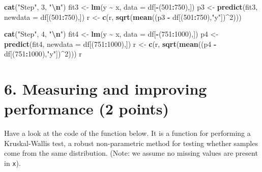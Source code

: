 \documentclass[
]{article}
\newenvironment{Shaded}{\begin{snugshade}}{\end{snugshade}}
\newcommand{\AttributeTok}[1]{\textcolor[rgb]{0.13,0.29,0.53}{#1}}
\newcommand{\DecValTok}[1]{\textcolor[rgb]{0.00,0.00,0.81}{#1}}
\newcommand{\FunctionTok}[1]{\textcolor[rgb]{0.13,0.29,0.53}{\textbf{#1}}}
\newcommand{\NormalTok}[1]{#1}
\newcommand{\OtherTok}[1]{\textcolor[rgb]{0.56,0.35,0.01}{#1}}
\newcommand{\SpecialCharTok}[1]{\textcolor[rgb]{0.81,0.36,0.00}{\textbf{#1}}}
\newcommand{\StringTok}[1]{\textcolor[rgb]{0.31,0.60,0.02}{#1}}
\begin{document}
\begin{Shaded}
\begin{Highlighting}[]
\FunctionTok{cat}\NormalTok{(}\StringTok{"Step"}\NormalTok{, }\DecValTok{3}\NormalTok{, }\StringTok{"}\SpecialCharTok{\textbackslash{}n}\StringTok{"}\NormalTok{)}
\NormalTok{fit3 }\OtherTok{\textless{}{-}} \FunctionTok{lm}\NormalTok{(y }\SpecialCharTok{\textasciitilde{}}\NormalTok{ x, }\AttributeTok{data =}\NormalTok{ df[}\SpecialCharTok{{-}}\NormalTok{(}\DecValTok{501}\SpecialCharTok{:}\DecValTok{750}\NormalTok{),])}
\NormalTok{p3 }\OtherTok{\textless{}{-}} \FunctionTok{predict}\NormalTok{(fit3, }\AttributeTok{newdata =}\NormalTok{ df[(}\DecValTok{501}\SpecialCharTok{:}\DecValTok{750}\NormalTok{),])}
\NormalTok{r }\OtherTok{\textless{}{-}} \FunctionTok{c}\NormalTok{(r, }\FunctionTok{sqrt}\NormalTok{(}\FunctionTok{mean}\NormalTok{((p3 }\SpecialCharTok{{-}}\NormalTok{ df[(}\DecValTok{501}\SpecialCharTok{:}\DecValTok{750}\NormalTok{),}\StringTok{"y"}\NormalTok{])}\SpecialCharTok{\^{}}\DecValTok{2}\NormalTok{)))}

\FunctionTok{cat}\NormalTok{(}\StringTok{"Step"}\NormalTok{, }\DecValTok{4}\NormalTok{, }\StringTok{"}\SpecialCharTok{\textbackslash{}n}\StringTok{"}\NormalTok{)}
\NormalTok{fit4 }\OtherTok{\textless{}{-}} \FunctionTok{lm}\NormalTok{(y }\SpecialCharTok{\textasciitilde{}}\NormalTok{ x, }\AttributeTok{data =}\NormalTok{ df[}\SpecialCharTok{{-}}\NormalTok{(}\DecValTok{751}\SpecialCharTok{:}\DecValTok{1000}\NormalTok{),])}
\NormalTok{p4 }\OtherTok{\textless{}{-}} \FunctionTok{predict}\NormalTok{(fit4, }\AttributeTok{newdata =}\NormalTok{ df[(}\DecValTok{751}\SpecialCharTok{:}\DecValTok{1000}\NormalTok{),])}
\NormalTok{r }\OtherTok{\textless{}{-}} \FunctionTok{c}\NormalTok{(r, }\FunctionTok{sqrt}\NormalTok{(}\FunctionTok{mean}\NormalTok{((p4 }\SpecialCharTok{{-}}\NormalTok{ df[(}\DecValTok{751}\SpecialCharTok{:}\DecValTok{1000}\NormalTok{),}\StringTok{"y"}\NormalTok{])}\SpecialCharTok{\^{}}\DecValTok{2}\NormalTok{)))  }
\NormalTok{r}
\end{Highlighting}
\end{Shaded}

\section{6. Measuring and improving performance (2
points)}\label{measuring-and-improving-performance-2-points}

Have a look at the code of the function below. It is a function for
performing a Kruskal-Wallis test, a robust non-parametric method for
testing whether samples come from the same distribution. (Note: we
assume no missing values are present in \texttt{x}).
\end{document}
